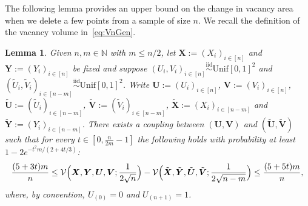 \documentclass[11pt]{article}
\newtheorem{lemma}[thm]{Lemma}
\newcommand{\iid}{\stackrel{\mathrm{iid}}\sim}
\newcommand{\bs}[1]{\boldsymbol{#1}}
\begin{document}
The following lemma provides an upper bound on the change in vacancy area when we delete a few points from a sample of size $n$. We recall the definition of the vacancy volume in~\eqref{eq:VnGen}.
\begin{lemma}
    \label{Lemma:DeletePoints}
Given $n,m\in\mathbb{N}$ with $m\leq n/2$, let $\bs{X}:=(X_i)_{i\in[n]}$ and $\bs{Y}:=(Y_i)_{i\in[n]}$ be fixed and suppose $(U_i, V_i)_{i\in[n]} \iid \mathrm{Unif}[0,1]^2$ and $(\tilde U_i, \tilde V_i)_{i\in[n-m]} \iid \mathrm{Unif}[0,1]^2$. Write $\bs{U}:=(U_i)_{i\in[n]}$, $\bs{V}:=(V_i)_{i\in[n]}$, $\tilde{\bs{U}}:=(\tilde U_i)_{i\in[n-m]}$, $\tilde{\bs{V}}:=(\tilde V_i)_{i\in[n-m]}$, $\tilde{\bs{X}}:=(X_i)_{i\in[n-m]}$ and $\tilde{\bs{Y}}:=(Y_i)_{i\in[n-m]}$. There exists a coupling between $(\bs{U},\bs{V})$ and $(\tilde{\bs{U}},\tilde{\bs{V}})$ such that for every $t\in[0, \frac{n}{2m}-1]$ the following holds with probability at least $1-2e^{-t^2m/(2+4t/3)}$:
    \[
    \frac{(5+3t)m}{n}\leq \mathcal{V}\Bigl(\bs{X},\bs{Y},\bs{U},\bs{V}; \frac{1}{2\sqrt{n}}\Bigr)  -  \mathcal{V}\Bigl(\tilde{\bs{X}},\tilde{\bs{Y}},\tilde{\bs{U}},\tilde{\bs{V}};\frac{1}{2\sqrt{n-m}}\Bigr) \leq \frac{(5+5t)m}{n},
    \]
    where, by convention, $U_{(0)} = 0$ and $U_{(n+1)} = 1$.
\end{lemma}
\end{document}
